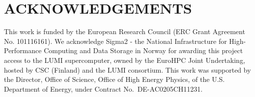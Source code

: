 \documentclass[a4paper,
               biblatex,     %
               ]{jacow}
\begin{document}
\section{ACKNOWLEDGEMENTS}
This work is funded by the European Research Council (ERC Grant Agreement No. 101116161). We acknowledge Sigma2 - the National Infrastructure for High-Performance Computing and Data Storage in Norway for awarding this project access to the LUMI supercomputer, owned by the EuroHPC Joint Undertaking, hosted by CSC (Finland) and the LUMI consortium. This work was supported by the Director, Office of Science, Office of High Energy Physics, of the U.S. Department of Energy, under Contract No.~DE-AC0205CH11231.
%
%
%
	{\printbibliography}%
	{
}
\end{document}
